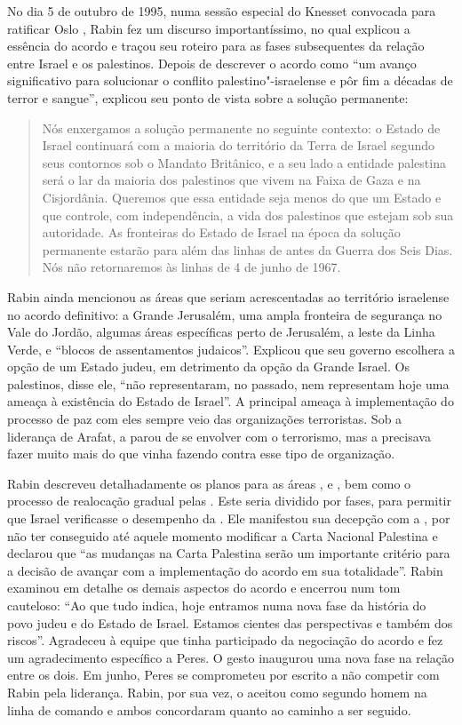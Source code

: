 No dia 5 de outubro de 1995, numa sessão especial do Knesset convocada
para ratificar Oslo , Rabin fez um discurso importantíssimo, no qual
explicou a essência do acordo e traçou seu roteiro para as fases
subsequentes da relação entre Israel e os palestinos. Depois de
descrever o acordo como ``um avanço significativo para solucionar o
conflito palestino"-israelense e pôr fim a décadas de terror e sangue'',
explicou seu ponto de vista sobre a solução permanente:

\begin{quote}
Nós enxergamos a solução permanente no seguinte contexto: o Estado de
Israel continuará com a maioria do território da Terra de Israel segundo
seus contornos sob o Mandato Britânico, e a seu lado a entidade
palestina será o lar da maioria dos palestinos que vivem na Faixa de
Gaza e na Cisjordânia. Queremos que essa entidade seja menos do que um
Estado e que controle, com independência, a vida dos palestinos que estejam
sob sua autoridade. As fronteiras do Estado de Israel na época da
solução permanente estarão para além das linhas de antes da Guerra dos
Seis Dias. Nós não retornaremos às linhas de 4 de junho de 1967.
\end{quote}

Rabin ainda mencionou as áreas que seriam acrescentadas ao território
israelense no acordo definitivo: a Grande Jerusalém, uma ampla fronteira
de segurança no Vale do Jordão, algumas áreas específicas perto de
Jerusalém, a leste da Linha Verde, e ``blocos de assentamentos
judaicos''. Explicou que seu governo escolhera a opção de um Estado
judeu, em detrimento da opção da Grande Israel. Os palestinos, disse
ele, ``não representaram, no passado, nem representam hoje uma ameaça à
existência do Estado de Israel''. A principal ameaça à implementação do
processo de paz com eles sempre veio das organizações terroristas. Sob a
liderança de Arafat, a  parou de se envolver com o terrorismo, mas a
 precisava fazer muito mais do que vinha fazendo contra esse tipo de
organização.

Rabin descreveu detalhadamente os planos 
para as áreas ,  e , bem
como o processo de realocação gradual pelas . Este seria
dividido por fases, para permitir que Israel verificasse o desempenho da
. Ele manifestou sua decepção com a , por não ter conseguido até
aquele momento modificar a Carta Nacional Palestina e declarou que ``as
mudanças na Carta Palestina serão um importante critério para a decisão
de avançar com a implementação do acordo em sua totalidade''. Rabin
examinou em detalhe os demais aspectos do acordo e encerrou num tom
cauteloso: ``Ao que tudo indica, hoje entramos numa nova fase da
história do povo judeu e do Estado de Israel. Estamos cientes das
perspectivas e também dos riscos''. Agradeceu à equipe que tinha
participado da negociação do acordo e fez um agradecimento específico a
Peres. O gesto inaugurou uma nova fase na relação entre os dois. Em
junho, Peres se comprometeu por escrito a não competir com Rabin pela
liderança. Rabin, por sua vez, o aceitou como segundo homem na linha de
comando e ambos concordaram quanto ao caminho a ser seguido.

